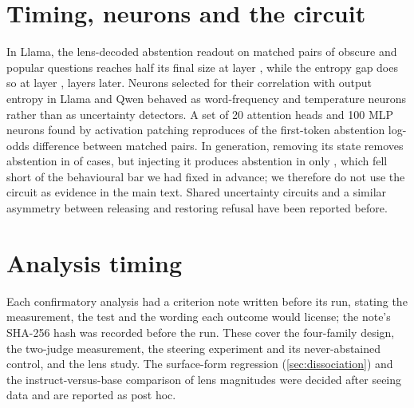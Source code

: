 \documentclass{article}
\begin{document}
\section{Timing, neurons and the circuit}
\label{app:circuit}

In Llama, the lens-decoded abstention readout on matched pairs of obscure and popular questions reaches half its final size at layer \ltHedgeHalf, while the entropy gap does so at layer \ltEntHalf, \ltLead{} layers later. Neurons selected for their correlation with output entropy in Llama and Qwen behaved as word-frequency and temperature neurons rather than as uncertainty detectors. A set of 20 attention heads and 100 MLP neurons found by activation patching \citep{wang2023ioi,syed2023attribution} reproduces \ciRecovery{} \ciRecoveryCI{} of the first-token abstention log-odds difference between matched pairs. In generation, removing its state removes abstention in \ciRemoveFlip{} of cases, but injecting it produces abstention in only \ciInjectFlip, which fell short of the behavioural bar we had fixed in advance; we therefore do not use the circuit as evidence in the main text. Shared uncertainty circuits \citep{teplica2025sciurus} and a similar asymmetry between releasing and restoring refusal \citep{liu2026broken} have been reported before.

\section{Analysis timing}
\label{app:timing}

Each confirmatory analysis had a criterion note written before its run, stating the measurement, the test and the wording each outcome would license; the note's SHA-256 hash was recorded before the run. These cover the four-family design, the two-judge measurement, the steering experiment and its never-abstained control, and the lens study. The surface-form regression (\cref{sec:dissociation}) and the instruct-versus-base comparison of lens magnitudes were decided after seeing data and are reported as post hoc.
\end{document}
